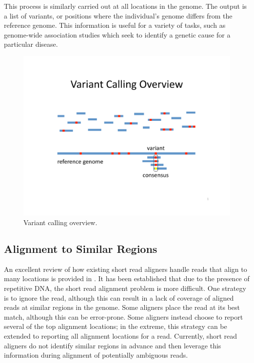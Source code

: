 \documentclass[twocolumn,10pt]{article}
\begin{document}
This process is similarly carried out at all locations in the genome.  The output is a list of variants, or positions where the individual's genome differs from the reference genome.  This information is useful for a variety of tasks, such as genome-wide association studies which seek to identify a genetic cause for a particular disease.  

\begin{figure}
\centering
\includegraphics[scale=0.6]{variantCalling.pdf}
\caption{Variant calling overview.}
\label{fig:variantCalling}
\end{figure}

\subsection{Alignment to Similar Regions}

An excellent review of how existing short read aligners handle reads that align to many locations is provided in \cite{Treangen:2012}.  It has been established that due to the presence of repetitive DNA, the short read alignment problem is more difficult.  One strategy is to ignore the read, although this can result in a lack of coverage of aligned reads at similar regions in the genome.  Some aligners place the read at its best match, although this can be error-prone.  Some aligners instead choose to report several of the top alignment locations; in the extreme, this strategy can be extended to reporting all alignment locations for a read.  Currently, short read aligners do not identify similar regions in advance and then leverage this information during alignment of potentially ambiguous reads.
\end{document}
